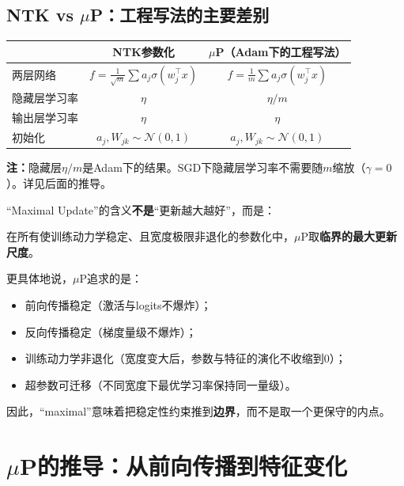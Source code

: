 \documentclass[11pt,a4paper]{article}
\newcommand{\cN}{\mathcal{N}}
\begin{document}
\subsection{NTK vs $\mu$P：工程写法的主要差别}

\begin{center}
\renewcommand{\arraystretch}{1.3}
\begin{tabular}{l|cc}
\toprule
& NTK参数化 & $\mu$P（Adam下的工程写法） \\
\midrule
两层网络 & $f=\frac{1}{\sqrt{m}}\sum a_j\sigma(w_j^\top x)$ & $f=\frac{1}{\boxed{m}}\sum a_j\sigma(w_j^\top x)$ \\
隐藏层学习率 & $\eta$ & $\eta/\boxed{m}$ \\
输出层学习率 & $\eta$ & $\eta$ \\
初始化 & $a_j,W_{jk}\sim\cN(0,1)$ & $a_j,W_{jk}\sim\cN(0,1)$ \\
\bottomrule
\end{tabular}
\end{center}

\textbf{注：}隐藏层$\eta/m$是Adam下的结果。SGD下隐藏层学习率不需要随$m$缩放（$\gamma=0$）。详见后面的推导。

``Maximal Update''的含义\textbf{不是}``更新越大越好''，而是：

\begin{tcolorbox}[colback=blue!5,colframe=blue!50!black]
在所有使训练动力学稳定、且宽度极限非退化的参数化中，$\mu$P取\textbf{临界的最大更新尺度}。
\end{tcolorbox}

更具体地说，$\mu$P追求的是：
\begin{itemize}[leftmargin=*]
\item 前向传播稳定（激活与logits不爆炸）；
\item 反向传播稳定（梯度量级不爆炸）；
\item 训练动力学非退化（宽度变大后，参数与特征的演化不收缩到0）；
\item 超参数可迁移（不同宽度下最优学习率保持同一量级）。
\end{itemize}
因此，``maximal''意味着把稳定性约束推到\textbf{边界}，而不是取一个更保守的内点。

\section{$\mu$P的推导：从前向传播到特征变化}
\end{document}
